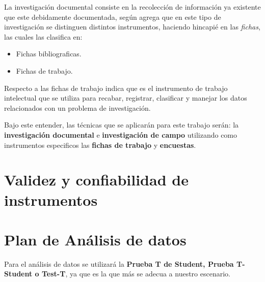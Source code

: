 La investigación documental consiste en la recolección de información ya existente
que este debidamente documentada, según \cite{robledo} agrega que en este tipo
de investigación se distinguen distintos instrumentos, haciendo hincapié en las
\emph{fichas}, las cuales \citep{robledo} las clasifica en:
\begin{itemize}
    \item Fichas bibliograficas.
    \item Fichas de trabajo.
\end{itemize}

Respecto a las fichas de trabajo \cite{robledo} indica que es el instrumento de
trabajo intelectual que se utiliza para recabar, registrar, clasificar y
manejar los datos relacionados con un problema de investigación.

Bajo este entender, las técnicas que se aplicarán para este trabajo serán:
la \textbf{investigación documental} e \textbf{investigación de campo} utilizando
como instrumentos especificos las \textbf{fichas de trabajo} y \textbf{encuestas}.

\section{Validez y confiabilidad de instrumentos}

\section{Plan de Análisis de datos}
Para el análisis de datos se utilizará la \textbf{Prueba T de Student, Prueba
T-Student o Test-T}, ya que es la que más se adecua a nuestro escenario.
